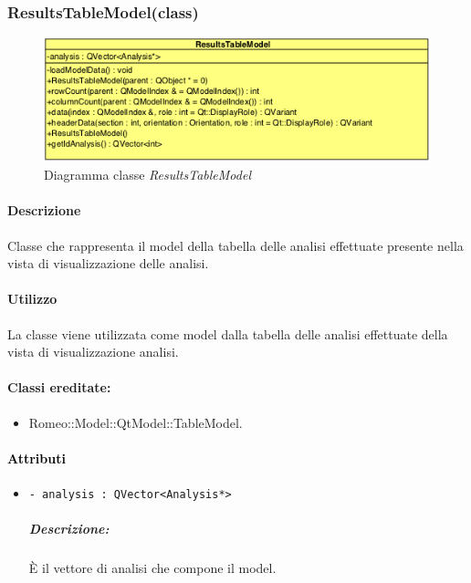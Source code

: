{%

\subsubsection{ResultsTableModel(class)}
\label{ResultsTableModel}
\begin{figure}[!h]
	\centering
	\includegraphics[width=0.6\linewidth]{./Content/Immagini/QtModel/ResultsTableModel.png}
	\caption{Diagramma classe \textsl{ResultsTableModel}}
	\label{comp_ResultsTableModel}
\end{figure}

\paragraph{Descrizione\\} 
Classe che rappresenta il model della tabella delle analisi effettuate presente nella vista di visualizzazione delle analisi.

\paragraph{Utilizzo\\}
La classe viene utilizzata come model dalla tabella delle analisi effettuate della vista di visualizzazione analisi.

\paragraph{Classi ereditate:}
\begin{itemize}
	\item Romeo::Model::QtModel::TableModel.
\end{itemize}

\paragraph{\textcolor{black}{Attributi\\}}
	\begin{itemize}
		\item \color{teal}\verb!- analysis : QVector<Analysis*>!
		\color{black}
		\subparagraph{Descrizione:} È il vettore di analisi che compone il model.
	\end{itemize}
	
}
